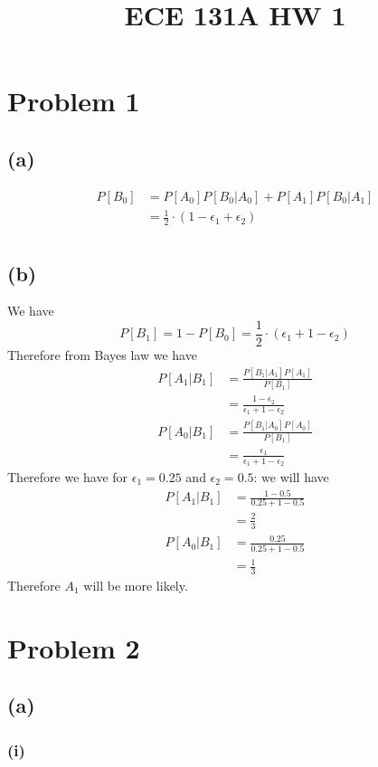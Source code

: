 
\title{ECE 131A HW 1}

\maketitle
\section*{Problem 1}
\subsection*{(a)}
\begin{align*}
    P[B_0]&=P[A_0]P[B_0|A_0]+P[A_1]P[B_0|A_1]\\
    &=\boxed{\frac{1}{2}\cdot(1-\epsilon_1+\epsilon_2)}\\
\end{align*}
\subsection*{(b)}
We have 
$$P[B_1]=1-P[B_0]=\frac{1}{2}\cdot(\epsilon_1+1-\epsilon_2)$$
Therefore from Bayes law we have
\begin{align*}
    P[A_1|B_1]&=\frac{P[B_1|A_1]P[A_1]}{P[B_1]}\\
    &=\frac{1-\epsilon_2}{\epsilon_1+1-\epsilon_2}
\end{align*}
\begin{align*}
    P[A_0|B_1]&=\frac{P[B_1|A_0]P[A_0]}{P[B_1]}\\
    &=\frac{\epsilon_1}{\epsilon_1+1-\epsilon_2}
\end{align*}
Therefore we have for $\epsilon_1=0.25$ and $\epsilon_2=0.5$:
we will have
\begin{align*}
    P[A_1|B_1]&=\frac{1-0.5}{0.25+1-0.5}\\
    &=\frac{2}{3}\\
    P[A_0|B_1]&=\frac{0.25}{0.25+1-0.5}\\
    &=\frac{1}{3}
\end{align*}
Therefore $A_1$ will be more likely. 
\section*{Problem 2}
\subsection*{(a)}
\subsubsection*{(i)}



